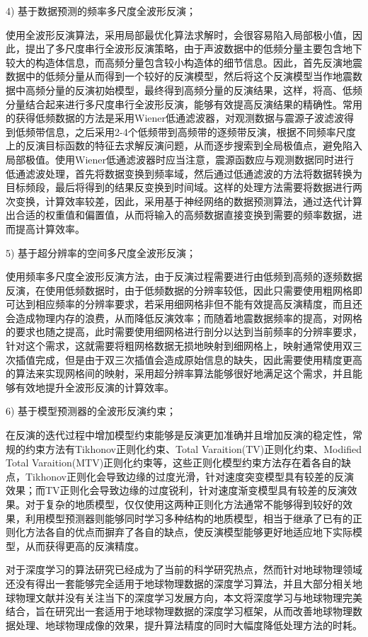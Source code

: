 \documentclass[11pt]{article}
\begin{document}
\par
4) 基于数据预测的频率多尺度全波形反演；
\par
使用全波形反演算法，采用局部最优化算法求解时，会很容易陷入局部极小值，因此，提出了多尺度串行全波形反演策略，由于声波数据中的低频分量主要包含地下较大的构造体信息，而高频分量包含较小构造体的细节信息。因此，首先反演地震数据中的低频分量从而得到一个较好的反演模型，然后将这个反演模型当作地震数据中高频分量的反演初始模型，最终得到高频分量的反演结果，这样，将高、低频分量结合起来进行多尺度串行全波形反演，能够有效提高反演结果的精确性。常用的获得低频数据的方法是采用Wiener低通滤波器，对观测数据与震源子波滤波得到低频带信息，之后采用2-4个低频带到高频带的逐频带反演，根据不同频率尺度上的反演目标函数的特征去求解反演问题，从而逐步搜索到全局极值点，避免陷入局部极值。使用Wiener低通滤波器时应当注意，震源函数应与观测数据同时进行低通滤波处理，首先将数据变换到频率域，然后通过低通滤波的方法将数据转换为目标频段，最后将得到的结果反变换到时间域。这样的处理方法需要将数据进行两次变换，计算效率较差，因此，采用基于神经网络的数据预测算法，通过迭代计算出合适的权重值和偏置值，从而将输入的高频数据直接变换到需要的频率数据，进而提高计算效率。
\par
5) 基于超分辨率的空间多尺度全波形反演；
\par
使用频率多尺度全波形反演方法，由于反演过程需要进行由低频到高频的逐频数据反演，在使用低频数据时，由于低频数据的分辨率较低，因此只需要使用粗网格即可达到相应频率的分辨率要求，若采用细网格非但不能有效提高反演精度，而且还会造成物理内存的浪费，从而降低反演效率；而随着地震数据频率的提高，对网格的要求也随之提高，此时需要使用细网格进行剖分以达到当前频率的分辨率要求，针对这个需求，这就需要将粗网格数据无损地映射到细网格上，映射通常使用双三次插值完成，但是由于双三次插值会造成原始信息的缺失，因此需要使用精度更高的算法来实现网格间的映射，采用超分辨率算法能够很好地满足这个需求，并且能够有效地提升全波形反演的计算效率。
\par
6) 基于模型预测器的全波形反演约束；
\par
在反演的迭代过程中增加模型约束能够是反演更加准确并且增加反演的稳定性，常规的约束方法有Tikhonov正则化约束、Total Varaition(TV)正则化约束、Modified Total Varaition(MTV)正则化约束等，这些正则化模型约束方法存在着各自的缺点，Tikhonov正则化会导致边缘的过度光滑，针对速度突变模型具有较差的反演效果；而TV正则化会导致边缘的过度锐利，针对速度渐变模型具有较差的反演效果。对于复杂的地质模型，仅仅使用这两种正则化方法通常不能够得到较好的效果，利用模型预测器则能够同时学习多种结构的地质模型，相当于继承了已有的正则化方法各自的优点而摒弃了各自的缺点，使反演模型能够更好地适应地下实际模型，从而获得更高的反演精度。
\par
对于深度学习的算法研究已经成为了当前的科学研究热点，然而针对地球物理领域还没有得出一套能够完全适用于地球物理数据的深度学习算法，并且大部分相关地球物理文献并没有关注当下的深度学习发展方向，本文将深度学习与地球物理完美结合，旨在研究出一套适用于地球物理数据的深度学习框架，从而改善地球物理数据处理、地球物理成像的效果，提升算法精度的同时大幅度降低处理方法的时耗。
\par
\newpage
\end{document}
